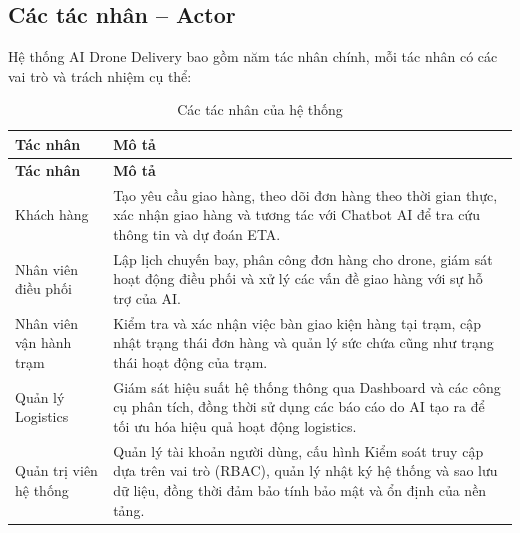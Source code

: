 \subsection{Các tác nhân -- Actor}

Hệ thống AI Drone Delivery bao gồm năm tác nhân chính, mỗi tác nhân có các vai trò và trách nhiệm cụ thể:

\begin{longtable}{|L{2.5cm}|L{12cm}|}

\caption{Các tác nhân của hệ thống}
\label{tab:cac-tac-nhan}
\\

\hline
\textbf{Tác nhân} & \textbf{Mô tả} \\
\hline

\endfirsthead

\hline
\textbf{Tác nhân} & \textbf{Mô tả} \\
\hline

\endhead

\hline
\endfoot

Khách hàng
&
Tạo yêu cầu giao hàng, theo dõi đơn hàng theo thời gian thực, xác nhận giao hàng và tương tác với Chatbot AI để tra cứu thông tin và dự đoán ETA. \\
\hline

Nhân viên điều phối
&
Lập lịch chuyến bay, phân công đơn hàng cho drone, giám sát hoạt động điều phối và xử lý các vấn đề giao hàng với sự hỗ trợ của AI. \\
\hline

Nhân viên vận hành trạm
&
Kiểm tra và xác nhận việc bàn giao kiện hàng tại trạm, cập nhật trạng thái đơn hàng và quản lý sức chứa cũng như trạng thái hoạt động của trạm. \\
\hline

Quản lý Logistics
&
Giám sát hiệu suất hệ thống thông qua Dashboard và các công cụ phân tích, đồng thời sử dụng các báo cáo do AI tạo ra để tối ưu hóa hiệu quả hoạt động logistics. \\
\hline

Quản trị viên hệ thống
&
Quản lý tài khoản người dùng, cấu hình Kiểm soát truy cập dựa trên vai trò (RBAC), quản lý nhật ký hệ thống và sao lưu dữ liệu, đồng thời đảm bảo tính bảo mật và ổn định của nền tảng. \\
\hline

\end{longtable}